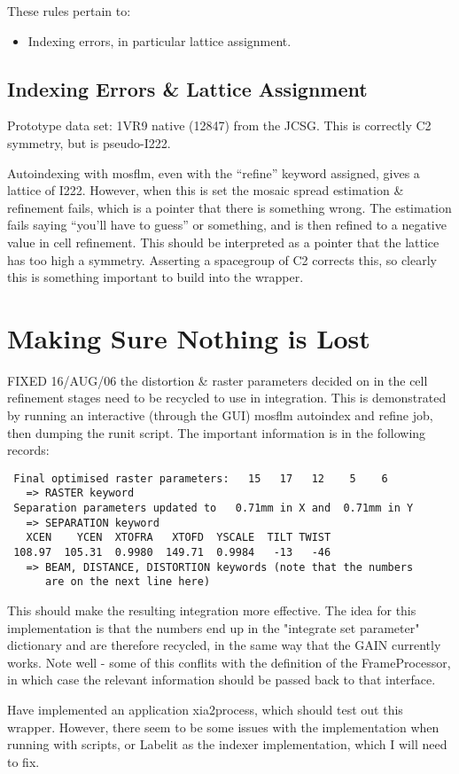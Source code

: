 \documentclass[a4paper, 11pt]{article}
\begin{document}
These rules pertain to:

\begin{itemize}
\item{Indexing errors, in particular lattice assignment.}
\end{itemize}

\subsection{Indexing Errors \& Lattice Assignment}

Prototype data set: 1VR9 native (12847) from the JCSG. This is correctly
C2 symmetry, but is pseudo-I222. 

Autoindexing with mosflm, even with the ``refine'' keyword assigned, gives
a lattice of I222. However, when this is set the mosaic spread 
estimation \& refinement fails, which is a pointer that there is 
something wrong. The estimation fails saying ``you'll have to guess'' or
something, and is then refined to a negative value in cell refinement. This
should be interpreted as a pointer that the lattice has too high a symmetry.
Asserting a spacegroup of C2 corrects this, so clearly this is something
important to build into the wrapper.

\section{Making Sure Nothing is Lost}

FIXED 16/AUG/06 the distortion \& raster parameters decided on in the 
cell refinement stages need to be recycled to use in integration. This is
demonstrated by running an interactive (through the GUI) mosflm autoindex
and refine job, then dumping the runit script. The important information is
in the following records:

{
\small
\begin{verbatim}
 Final optimised raster parameters:   15   17   12    5    6
   => RASTER keyword
 Separation parameters updated to   0.71mm in X and  0.71mm in Y
   => SEPARATION keyword
   XCEN    YCEN  XTOFRA   XTOFD  YSCALE  TILT TWIST
 108.97  105.31  0.9980  149.71  0.9984   -13   -46
   => BEAM, DISTANCE, DISTORTION keywords (note that the numbers
      are on the next line here)
\end{verbatim}
}

This should make the resulting integration more effective. The idea
for this implementation is that the numbers end up in the "integrate
set parameter" dictionary and are therefore recycled, in the same way
that the GAIN currently works. Note well - some of this conflits with the 
definition of the FrameProcessor, in which case the relevant information
should be passed back to that interface.

Have implemented an application xia2process, which should test out this 
wrapper. However, there seem to be some issues with the implementation 
when running with scripts, or Labelit as the indexer implementation, 
which I will need to fix.
\end{document}
